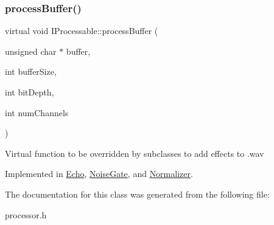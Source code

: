 \subsubsection{\texorpdfstring{process\+Buffer()}{processBuffer()}}
{\footnotesize\ttfamily virtual void I\+Processable\+::process\+Buffer (\begin{DoxyParamCaption}\item[{unsigned char $\ast$}]{buffer,  }\item[{int}]{buffer\+Size,  }\item[{int}]{bit\+Depth,  }\item[{int}]{num\+Channels }\end{DoxyParamCaption})\hspace{0.3cm}{\ttfamily [pure virtual]}}

Virtual function to be overridden by subclasses to add effects to .wav 

Implemented in \hyperlink{classEcho_a1cdbe4bf78f5f6ac9b3609d9cd32de94}{Echo}, \hyperlink{classNoiseGate_a7d58bdbe85f4e2709c77f5d3d5f34e09}{Noise\+Gate}, and \hyperlink{classNormalizer_ab17632635876ca5cf6da795525889761}{Normalizer}.



The documentation for this class was generated from the following file\+:\begin{DoxyCompactItemize}
\item 
processor.\+h\end{DoxyCompactItemize}
